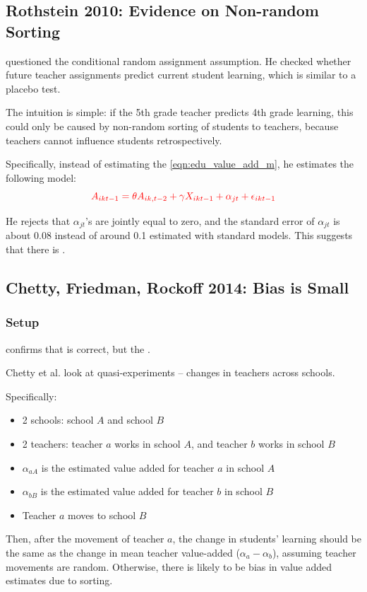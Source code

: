     \subsection{Rothstein 2010: Evidence on Non-random Sorting}
        \cite{rothstein_teacher_2010} questioned the conditional random assignment assumption. He checked whether future teacher assignments predict current student learning, which is similar to a placebo test.

        The intuition is simple: if the 5th grade teacher predicts 4th grade learning, this could only be caused by non-random sorting of students to teachers, because teachers cannot influence students retrospectively.

        Specifically, instead of estimating the \ref{eqn:edu_value_add_m}, he estimates the following model:
        \begin{equation*}
            \color{red}
                A_{ikt-1} = \theta A_{ik,t-2} + \gamma X_{ikt-1} + \alpha_{jt} + \epsilon_{ikt-1}
        \end{equation*}

        He rejects that $\alpha_{jt}$'s are jointly equal to zero, and the standard error of $\alpha_{jt}$ is about 0.08 instead of around 0.1 estimated with standard models. This suggests that there is .
        
    \subsection{Chetty, Friedman, Rockoff 2014: Bias is Small}

        \subsubsection{Setup}
            \cite{chetty_measuring_2014-1} confirms that \cite{rothstein_teacher_2010} is correct, but the .
    
            Chetty et al. look at quasi-experiments -- changes in teachers across schools.
    
            Specifically:
            \begin{itemize}
                \item 2 schools: school $A$ and school $B$
                \item 2 teachers: teacher $a$ works in school $A$, and teacher $b$ works in school $B$
                \item $\alpha_{aA}$ is the estimated value added for teacher $a$ in school $A$
                \item $\alpha_{bB}$ is the estimated value added for teacher $b$ in school $B$
                \item Teacher $a$ moves to school $B$
            \end{itemize}
            Then, after the movement of teacher $a$, the change in students' learning should be the same as the change in mean teacher value-added ($\alpha _{a}-\alpha_{b}$), assuming teacher movements are random. Otherwise, there is likely to be bias in value added estimates due to sorting.

